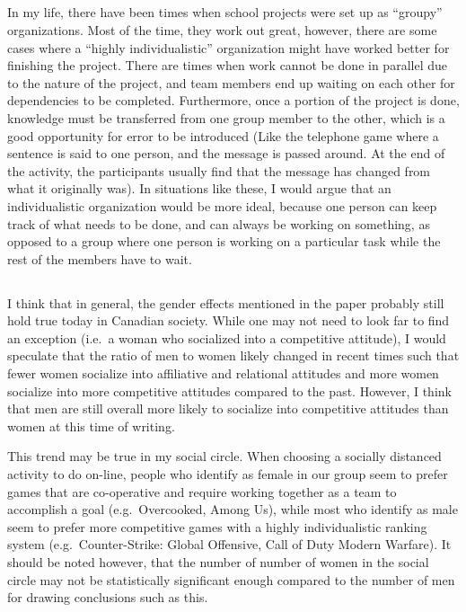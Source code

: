 \documentclass[letterpaper,12pt]{article}
\begin{document}
\subsection{}
In my life, there have been times when school projects were set up as
``groupy'' organizations.  Most of the time, they work out great, however,
there are some cases where a ``highly individualistic'' organization  might
have worked better for finishing the project. There are times when work
cannot be done in parallel due to the nature of the project, and team members
end up waiting on each other for dependencies to be completed. Furthermore,
once a portion of the project is done, knowledge must be transferred from one
group member to the other, which is a good opportunity for error to be
introduced (Like the telephone game where a sentence is said to one person,
and the message is passed around. At the end of the activity, the
participants usually find that the message has changed from what it
originally was). In situations like these, I would argue that an
individualistic organization would be more ideal, because one person can keep
track of what needs to be done, and can always be working on something, as
opposed to a group where one person is working on a particular task while
the rest of the members have to wait.


\subsection{}
I think that in general, the gender effects mentioned in the paper probably
still hold true today in Canadian society. While one may not need to look far to
find an exception (i.e.\ a woman who socialized into a competitive attitude),
I would speculate that the ratio of men to women likely changed in recent
times such that fewer women socialize into affiliative and relational
attitudes and more women socialize into more competitive attitudes compared
to the past. However, I think that men are still overall more likely to socialize
into competitive attitudes than women at this time of writing.

This trend may be true in my social circle.  When choosing a socially
distanced activity to do on-line, people who identify as female in our group
seem to prefer games that are co-operative and require working together as a
team to accomplish a goal (e.g.\ Overcooked, Among Us), while most who
identify as male seem to prefer more competitive games with a highly
individualistic ranking system (e.g.\ Counter-Strike: Global Offensive, Call
of Duty Modern Warfare). It should be noted however, that the number of
number of women in the social circle may not be statistically significant
enough compared to the number of men for drawing conclusions such as this.
\end{document}
